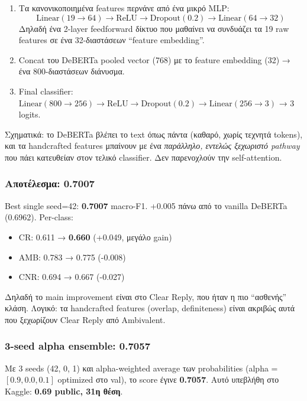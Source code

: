 \documentclass[12pt]{fphw}
\begin{document}
\begin{enumerate}
    \item Τα κανονικοποιημένα features περνάνε από ένα μικρό MLP:
    \[
    \text{Linear}(19 \to 64) \to \text{ReLU} \to \text{Dropout}(0.2) \to \text{Linear}(64 \to 32)
    \]
    Δηλαδή ένα 2-layer feedforward δίκτυο που μαθαίνει να συνδυάζει τα 19 raw features σε ένα 32-διαστάσεων ``feature embedding''.

    \item Concat του DeBERTa pooled vector (768) με το feature embedding (32) → ένα 800-διαστάσεων διάνυσμα.

    \item Final classifier: \(\text{Linear}(800 \to 256) \to \text{ReLU} \to \text{Dropout}(0.2) \to \text{Linear}(256 \to 3)\) → 3 logits.
\end{enumerate}

Σχηματικά: το DeBERTa βλέπει το text όπως πάντα (καθαρό, χωρίς τεχνητά tokens), και τα handcrafted features μπαίνουν με ένα \emph{παράλληλο, εντελώς ξεχωριστό pathway} που πάει κατευθείαν στον τελικό classifier. Δεν παρενοχλούν την self-attention.

\subsubsection{Αποτέλεσμα: 0.7007}

Best single seed=42: \textbf{0.7007} macro-F1. +0.005 πάνω από το vanilla DeBERTa (0.6962). Per-class:
\begin{itemize}
    \item CR: 0.611 → \textbf{0.660} (+0.049, μεγάλο gain)
    \item AMB: 0.783 → 0.775 (-0.008)
    \item CNR: 0.694 → 0.667 (-0.027)
\end{itemize}

Δηλαδή το main improvement είναι στο Clear Reply, που ήταν η πιο ``ασθενής'' κλάση. Λογικό: τα handcrafted features (overlap, definiteness) είναι ακριβώς αυτά που ξεχωρίζουν Clear Reply από Ambivalent.

\subsubsection{3-seed alpha ensemble: 0.7057}

Με 3 seeds (42, 0, 1) και alpha-weighted average των probabilities (alpha = $[0.9, 0.0, 0.1]$ optimized στο val), το score έγινε \textbf{0.7057}. Αυτό υπεβλήθη στο Kaggle: \textbf{0.69 public, 31η θέση}.
\end{document}
